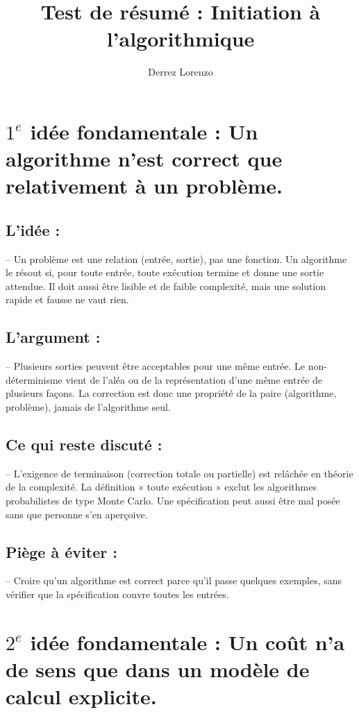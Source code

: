 \documentclass{article}
\title{\textbf{Test de résumé : Initiation à l'algorithmique}}
\author{Derrez Lorenzo}
\begin{document}
\maketitle

\section*{\textbf{$1^{e}$ idée fondamentale} : Un algorithme n'est correct que relativement à un problème.}

\subsection*{\textbf{L'idée} :}
\qquad -- Un problème est une relation (entrée, sortie), pas une fonction. Un algorithme le résout si, pour toute entrée, toute exécution termine et donne une sortie attendue. Il doit aussi être lisible et de faible complexité, mais une solution rapide et fausse ne vaut rien. 

\subsection*{\textbf{L'argument} :}
\qquad -- Plusieurs sorties peuvent être acceptables pour une même entrée. Le non-déterminisme vient de l'aléa ou de la représentation d'une même entrée de plusieurs façons. La correction est donc une propriété de la paire (algorithme, problème), jamais de l'algorithme seul.


\subsection*{\textbf{Ce qui reste discuté} :}
\qquad -- L'exigence de terminaison (correction totale ou partielle) est relâchée en théorie de la complexité. La définition « toute exécution » exclut les algorithmes probabilistes de type Monte Carlo. Une spécification peut aussi être mal posée sans que personne s'en aperçoive.


\subsection*{\textbf{Piège à éviter} :}
\qquad -- Croire qu'un algorithme est correct parce qu'il passe quelques exemples, sans vérifier que la spécification couvre toutes les entrées.

\section*{\textbf{$2^e$ idée fondamentale} : Un coût n'a de sens que dans un modèle de calcul explicite.}
\end{document}
